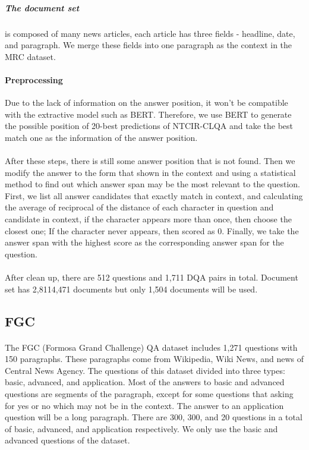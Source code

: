 \documentclass{article}
\begin{document}
\subparagraph{The document set} is composed of many news articles, each article has three fields - headline, date, and paragraph. We merge these fields into one paragraph as the context in the MRC dataset.

\paragraph{Preprocessing}
Due to the lack of information on the answer position, it won't be compatible with the extractive model such as BERT. Therefore, we use BERT to generate the possible position of 20-best predictions of NTCIR-CLQA and take the best match one as the information of the answer position.

\paragraph{}
After these steps, there is still some answer position that is not found. Then we modify the answer to the form that shown in the context and using a statistical method to find out which answer span may be the most relevant to the question. First, we list all answer candidates that exactly match in context, and calculating the average of reciprocal of the distance of each character in question and candidate in context, if the character appears more than once, then choose the closest one; If the character never appears, then scored as 0. Finally, we take the answer span with the highest score as the corresponding answer span for the question.

\paragraph{}
After clean up, there are 512 questions and 1,711 DQA pairs in total. Document set has 2,8114,471 documents but only 1,504 documents will be used.

\subsection{FGC}
\paragraph{}
The FGC (Formosa Grand Challenge) QA dataset includes 1,271 questions with 150 paragraphs. These paragraphs come from Wikipedia, Wiki News, and news of Central News Agency. The questions of this dataset divided into three types: basic, advanced, and application. Most of the answers to basic and advanced questions are segments of the paragraph, except for some questions that asking for yes or no which may not be in the context. The answer to an application question will be a long paragraph. There are 300, 300, and 20 questions in a total of basic, advanced, and application respectively. We only use the basic and advanced questions of the dataset.
\end{document}
